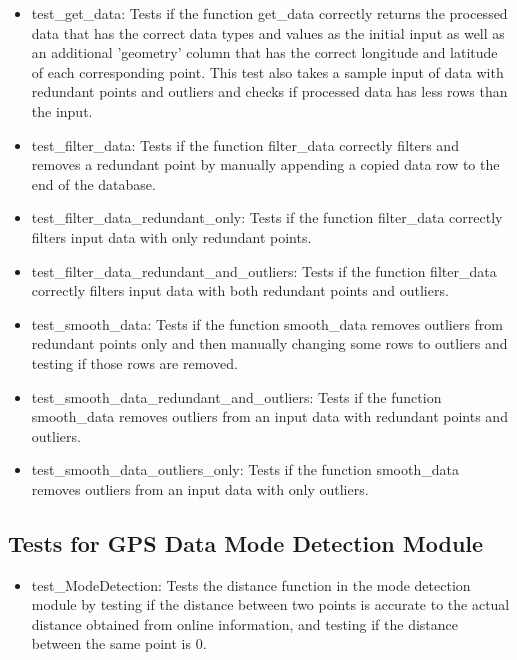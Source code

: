 \documentclass[12pt, titlepage]{article}
\begin{document}
\begin{itemize}
    \item test\_get\_data: Tests if the function get\_data correctly returns the processed data that has the correct data types and values as the initial input as well as an additional 'geometry' column that has the correct longitude and latitude of each corresponding point. This test also takes a sample input of data with redundant points and outliers and checks if processed data has less rows than the input.
    \item test\_filter\_data: Tests if the function filter\_data correctly filters and removes a redundant point by manually appending a copied data row to the end of the database.
    \item test\_filter\_data\_redundant\_only: Tests if the function filter\_data correctly filters input data with only redundant points.
    \item test\_filter\_data\_redundant\_and\_outliers: Tests if the function filter\_data correctly filters input data with both redundant points and outliers.
    \item test\_smooth\_data: Tests if the function smooth\_data removes outliers from redundant points only and then manually changing some rows to outliers and testing if those rows are removed.
    \item test\_smooth\_data\_redundant\_and\_outliers: Tests if the function smooth\_data removes outliers from an input data with redundant points and outliers.
    \item test\_smooth\_data\_outliers\_only: Tests if the function smooth\_data removes outliers from an input data with only outliers.
\end{itemize}

\subsection{Tests for GPS Data Mode Detection Module}
\begin{itemize}
    \item test\_ModeDetection: Tests the distance function in the mode detection module by testing if the distance between two points is accurate to the actual distance obtained from online information, and testing if the distance between the same point is 0.
\end{itemize}
\end{document}
